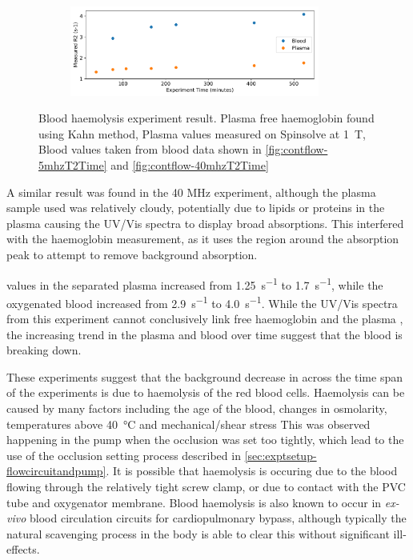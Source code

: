 \begin{figure}[h!tp]
\begin{subfigure}{\textwidth}
\includegraphics[width=0.9\textwidth]{figures/contflow/40haemolysePlasT2.pdf}
\end{subfigure}
\caption[Blood haemolysis experiment result]{Blood haemolysis experiment result. Plasma free haemoglobin found using Kahn method, Plasma \Rtwo values measured on Spinsolve at \SI{1}{T}, Blood \Rtwo values taken from blood data shown in \autoref{fig:contflow-5mhzT2Time} and \autoref{fig:contflow-40mhzT2Time}}
\label{fig:contflow-haemolyseResult}
\end{figure}
A similar result was found in the 40 MHz experiment, although the plasma sample used was relatively cloudy, potentially due to lipids or proteins in the plasma causing the UV/Vis spectra to display broad absorptions.
This interfered with the haemoglobin measurement, as it uses the region around the absorption peak to attempt to remove background absorption.

\Rtwo values in the separated plasma increased from \SI{1.25}{s^{-1}} to \SI{1.7}{s^{-1}}, while the oxygenated blood increased from \SI{2.9}{s^{-1}} to \SI{4.0}{s^{-1}}.
While the UV/Vis spectra from this experiment cannot conclusively link free haemoglobin and the plasma \Rtwo, the increasing trend in the plasma \Rtwo and blood \Rtwo over time suggest that the blood is breaking down.

These experiments suggest that the background decrease in \Ttwo across the time span of the experiments is due to haemolysis of the red blood cells.
Haemolysis can be caused by many factors including the age of the blood, changes in osmolarity, temperatures above \SI{40}{\celsius} and mechanical/shear stress\cite{Sowemimo-CokerRedbloodcell2002}
This was observed happening in the pump when the occlusion was set too tightly, which lead to the use of the occlusion setting process described in \autoref{sec:exptsetup-flowcircuitandpump}.
It is possible that haemolysis is occuring due to the blood flowing through the relatively tight screw clamp, or due to contact with the PVC tube and oxygenator membrane.
Blood haemolysis is also known to occur in \textit{ex-vivo} blood circulation circuits for cardiopulmonary bypass, although typically the natural scavenging process in the body is able to clear this without significant ill-effects\cite{VercaemstHemolysiscardiacsurgery2008}.

